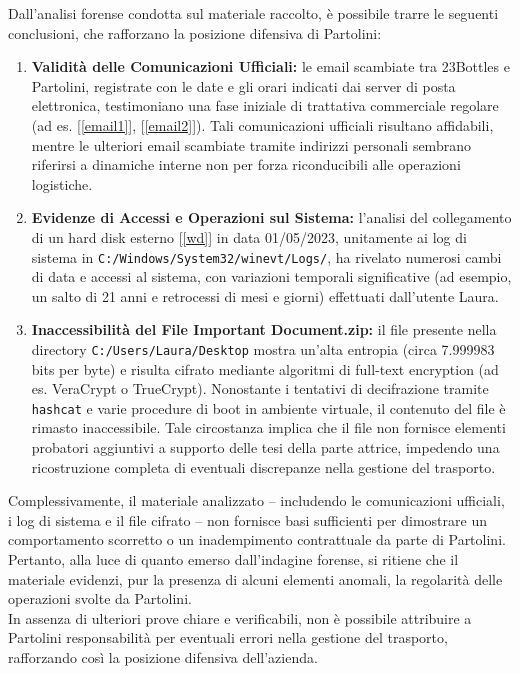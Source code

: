 Dall’analisi forense condotta sul materiale raccolto, è possibile trarre le seguenti conclusioni, che rafforzano la posizione difensiva di Partolini:

\begin{enumerate}
    \item \textbf{Validità delle Comunicazioni Ufficiali:}  
    le email scambiate tra 23Bottles e Partolini, registrate con le date e gli orari indicati dai server di posta elettronica, testimoniano una fase iniziale di trattativa commerciale regolare (ad es. [\ref{email1}], [\ref{email2}]). Tali comunicazioni ufficiali risultano affidabili, mentre le ulteriori email scambiate tramite indirizzi personali sembrano riferirsi a dinamiche interne non per forza riconducibili alle operazioni logistiche.

    \item \textbf{Evidenze di Accessi e Operazioni sul Sistema:}  
    l’analisi del collegamento di un hard disk esterno [\ref{wd}] in data 01/05/2023, unitamente ai log di sistema in \texttt{C:/Windows/System32/winevt/Logs/}, ha rivelato numerosi cambi di data e accessi al sistema, con variazioni temporali significative (ad esempio, un salto di 21 anni e retrocessi di mesi e giorni) effettuati dall’utente Laura.

    \item \textbf{Inaccessibilità del File Important Document.zip:}  
    il file presente nella directory \texttt{C:/Users/Laura/Desktop} mostra un’alta entropia (circa 7.999983 bits per byte) e risulta cifrato mediante algoritmi di full-text encryption (ad es. VeraCrypt o TrueCrypt). Nonostante i tentativi di decifrazione tramite \texttt{hashcat} e varie procedure di boot in ambiente virtuale, il contenuto del file è rimasto inaccessibile. Tale circostanza implica che il file non fornisce elementi probatori aggiuntivi a supporto delle tesi della parte attrice, impedendo una ricostruzione completa di eventuali discrepanze nella gestione del trasporto.
\end{enumerate}
Complessivamente, il materiale analizzato – includendo le comunicazioni ufficiali, i log di sistema e il file cifrato – non fornisce basi sufficienti per dimostrare un comportamento scorretto o un inadempimento contrattuale da parte di Partolini.\vspace{14pt}\\
Pertanto, alla luce di quanto emerso dall’indagine forense, si ritiene che il materiale evidenzi, pur la presenza di alcuni elementi anomali, la regolarità delle operazioni svolte da Partolini.\\In assenza di ulteriori prove chiare e verificabili, non è possibile attribuire a Partolini responsabilità per eventuali errori nella gestione del trasporto, rafforzando così la posizione difensiva dell’azienda.

